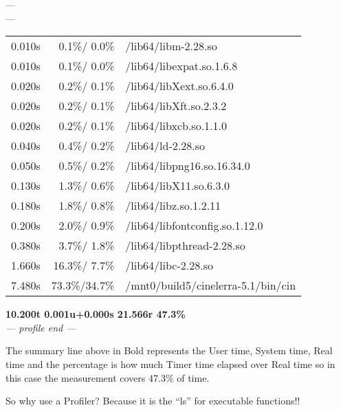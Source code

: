 ---\\
---\\
\begin{tabular}{@{}rrl}
 0.010s & 0.1\%/  0.0\% & /lib64/libm-2.28.so\\
 0.010s & 0.1\%/  0.0\% & /lib64/libexpat.so.1.6.8\\
 0.020s & 0.2\%/  0.1\% & /lib64/libXext.so.6.4.0\\
 0.020s & 0.2\%/  0.1\% & /lib64/libXft.so.2.3.2\\
 0.020s & 0.2\%/  0.1\% & /lib64/libxcb.so.1.1.0\\
 0.040s & 0.4\%/  0.2\% & /lib64/ld-2.28.so\\
 0.050s & 0.5\%/  0.2\% & /lib64/libpng16.so.16.34.0\\
 0.130s & 1.3\%/  0.6\% & /lib64/libX11.so.6.3.0\\
 0.180s & 1.8\%/  0.8\% & /lib64/libz.so.1.2.11\\
 0.200s & 2.0\%/  0.9\% & /lib64/libfontconfig.so.1.12.0\\
 0.380s & 3.7\%/  1.8\% & /lib64/libpthread-2.28.so\\
 1.660s & 16.3\%/ 7.7\% & /lib64/libc-2.28.so\\
 7.480s & 73.3\%/34.7\% & /mnt0/build5/cinelerra-5.1/bin/cin\\
\end{tabular}

\textbf{10.200t 0.001u+0.000s 21.566r  47.3\%}\\
\textit{--- profile end ---}

The summary line above in Bold represents the User time, System time, Real time and the percentage is how much Timer time elapsed over Real time so in this case the measurement covers 47.3\% of time.

So why use a Profiler? Because it is the ``ls'' for executable functions!!
